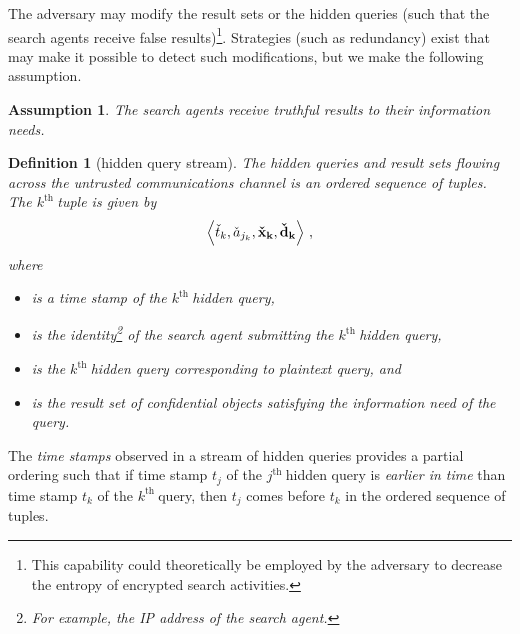 \documentclass[final,11pt]{article}
\newcommand{\hrs}[1][]{%
   \ifthenelse{ \equal{#1}{} }
      {\ensuremath{\vec{\check{d}}}}
      {\ensuremath{\vec{\check{d}_{#1}}}}
}
\newcommand{\hqb}[1][]{%
   \ifthenelse{ \equal{#1}{} }
      {\ensuremath{\vec{\check{x}}}}
      {\ensuremath{\vec{\check{x}_{#1}}}}
}
\newcommand{\hts}[1][]{%
   \ifthenelse{ \equal{#1}{} }
      {\ensuremath{\check{t}}}
      {\ensuremath{\check{t}_{#1}}}
}
\newcommand{\hsa}[1][]{%
   \ifthenelse{ \equal{#1}{} }
      {\ensuremath{\check{a}}}
      {\ensuremath{\check{a}_{#1}}}
}
\newcommand{\kth}{$k^{\text{th }}$}
\newcommand{\jth}{$j^{\text{th }}$}
\renewcommand{\vec}[1]{\boldsymbol{\mathbf{#1}}}
\numberwithin{equation}{section}
\theoremstyle{plain}
\newtheorem{definition}{Definition}[section]
\newtheorem{assumption}{Assumption}[section]
\theoremstyle{remark}
\begin{document}
The adversary may modify the result sets or the hidden queries (such that the search agents receive false results)\footnote{This capability could theoretically be employed by the adversary to decrease the entropy of encrypted search activities.}. Strategies (such as redundancy) exist that may make it possible to detect such modifications, but we make the following assumption.
\begin{assumption}
The search agents receive \emph{truthful} results to their \emph{information needs}.
\end{assumption}

\begin{definition}[hidden query stream]
The hidden queries and result sets flowing across the \emph{untrusted} communications channel is an ordered sequence of tuples. The \kth tuple is given by
\begin{equation}
    \left\langle \hts[k], \hsa[j_k], \hqb[k], \hrs[k] \right\rangle\,,
\end{equation}
where 
\begin{itemize}
    \item[$\hts{j}$] is a \emph{time stamp} of the \kth hidden query,
    \item[$\hsa{j_k}$] is the \emph{identity}\footnote{For example, the IP address of the search agent.} of the search agent submitting the \kth hidden query,
    \item[$\hqb{k}$] is the \kth hidden query corresponding to plaintext query, and
    \item[$\hrs{k}$] is the result set of \emph{confidential} objects satisfying the \emph{information need} of the query.    
\end{itemize}
\end{definition}
The \emph{time stamps} observed in a stream of hidden queries provides a partial ordering such that if time stamp $t_j$ of the \jth hidden query is \emph{earlier in time} than time stamp $t_k$ of the \kth query, then $t_j$ comes before $t_k$ in the ordered sequence of tuples.
\end{document}
